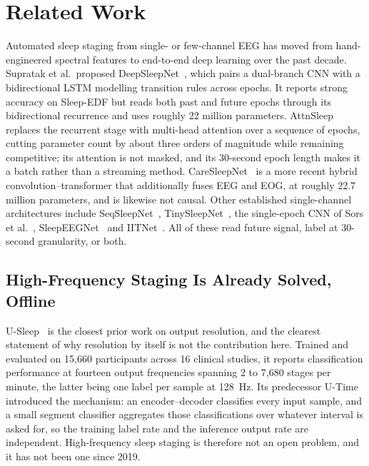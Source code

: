 \documentclass[conference]{IEEEtran}
\begin{document}
\section{Related Work}

Automated sleep staging from single- or few-channel EEG has moved from hand-engineered spectral
features to end-to-end deep learning over the past decade. Supratak et al.\ proposed
DeepSleepNet~\cite{deepsleepnet}, which pairs a dual-branch CNN with a bidirectional LSTM
modelling transition rules across epochs. It reports strong accuracy on Sleep-EDF but reads both
past and future epochs through its bidirectional recurrence and uses roughly 22 million
parameters. AttnSleep~\cite{attnsleep} replaces the recurrent stage with multi-head attention
over a sequence of epochs, cutting parameter count by about three orders of magnitude while
remaining competitive; its attention is not masked, and its 30-second epoch length makes it a
batch rather than a streaming method. CareSleepNet~\cite{caresleepnet} is a more recent hybrid
convolution--transformer that additionally fuses EEG and EOG, at roughly 22.7 million
parameters, and is likewise not causal. Other established single-channel architectures include
SeqSleepNet~\cite{seqsleepnet}, TinySleepNet~\cite{tinysleepnet}, the single-epoch CNN of Sors
et al.~\cite{sors}, SleepEEGNet~\cite{sleepeegnet} and IITNet~\cite{iitnet}. All of these read
future signal, label at 30-second granularity, or both.

\subsection{High-Frequency Staging Is Already Solved, Offline}

U-Sleep~\cite{usleep} is the closest prior work on output resolution, and the clearest statement
of why resolution by itself is not the contribution here. Trained and evaluated on 15{,}660
participants across 16 clinical studies, it reports classification performance at fourteen output
frequencies spanning 2 to 7{,}680 stages per minute, the latter being one label per sample at
128~Hz. Its predecessor U-Time~\cite{utime} introduced the mechanism: an encoder--decoder
classifies every input sample, and a small segment classifier aggregates those classifications
over whatever interval is asked for, so the training label rate and the inference output rate are
independent. High-frequency sleep staging is therefore not an open problem, and it has not been
one since 2019.
\end{document}
